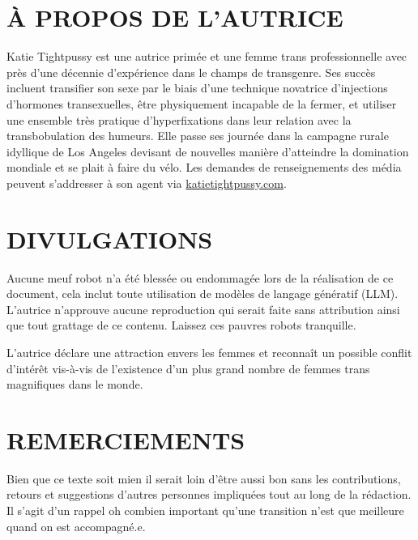 \documentclass{article}
\begin{document}
\section*{À PROPOS DE L'AUTRICE}

Katie Tightpussy est une autrice primée et une femme trans professionnelle avec près d'une décennie d'expérience dans le champs de transgenre. Ses succès incluent transifier son sexe par le biais d'une technique novatrice d'injections d'hormones transexuelles, être physiquement incapable de la fermer, et utiliser une ensemble très pratique d'hyperfixations dans leur relation avec la transbobulation des humeurs. Elle passe ses journée dans la campagne rurale idyllique de Los Angeles devisant de nouvelles manière d'atteindre la domination mondiale et se plait à faire du vélo. Les demandes de renseignements des média peuvent s'addresser à son agent via \href{http://katietightpussy.com}{katietightpussy.com}. 


 

\section*{DIVULGATIONS}

Aucune meuf robot n'a été blessée ou endommagée lors de la réalisation de ce document, cela inclut toute utilisation de modèles de langage génératif (LLM). L'autrice n'approuve aucune reproduction qui serait faite sans attribution ainsi que tout grattage de ce contenu. Laissez ces pauvres robots tranquille.

L'autrice déclare une attraction envers les femmes et reconnaît un possible conflit d'intérêt vis-à-vis de l'existence d'un plus grand nombre de femmes trans magnifiques dans le monde.

 

\section*{REMERCIEMENTS}

Bien que ce texte soit mien il serait loin d'être aussi bon sans les contributions, retours et suggestions d'autres personnes impliquées tout au long de la rédaction. Il s'agit d'un rappel oh combien important qu'une transition n'est que meilleure quand on est accompagné.e.
\end{document}

